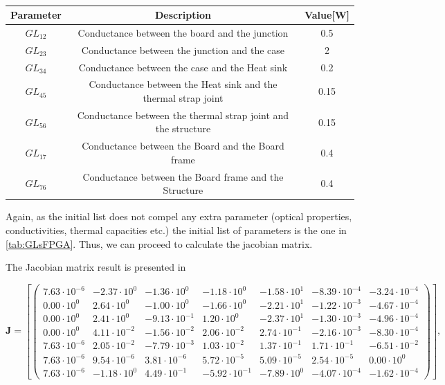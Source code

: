 \begin{table}[H]
\centering
\caption{}
\label{tab:GLsFPGA}

\begin{tabular}{c c c}
\toprule
\multicolumn{1}{c}{\textbf{Parameter}} & \multicolumn{1}{c}{\textbf{Description}} & \multicolumn{1}{c}{\textbf{Value}[W]} \\ \midrule
$GL_{12}$  & Conductance between the board and the junction  & 0.5 \\ 
$GL_{23}$  & Conductance between the junction and the case  &  2\\ 
$GL_{34}$  & Conductance between the case and the Heat sink  & 0.2 \\ 
$GL_{45}$  & Conductance between the Heat sink and the thermal strap joint  & 0.15 \\ 
$GL_{56}$  & Conductance between the thermal strap joint and the structure  & 0.15 \\ 
$GL_{17}$  & Conductance between the Board and the Board frame  & 0.4 \\ 
$GL_{76}$  & Conductance between the Board frame and the Structure  & 0.4 \\ \bottomrule
\end{tabular}
\end{table}

Again, as the initial list does not compel any extra parameter (optical properties, conductivities, thermal capacities etc.) the initial list of parameters is the one in \autoref{tab:GLsFPGA}. Thus, we can proceed to calculate the jacobian matrix.

The Jacobian matrix result is presented in 

\begin{equation}
\boldsymbol{J} =\left[\begin{pmatrix}
    7.63 \cdot 10^{-6} & -2.37 \cdot 10^{0} & -1.36 \cdot 10^{0} & -1.18 \cdot 10^{0} & -1.58 \cdot 10^{1} & -8.39 \cdot 10^{-4} & -3.24 \cdot 10^{-4} \\
    0.00 \cdot 10^{0} & 2.64 \cdot 10^{0} & -1.00 \cdot 10^{0} & -1.66 \cdot 10^{0} & -2.21 \cdot 10^{1} & -1.22 \cdot 10^{-3} & -4.67 \cdot 10^{-4} \\
    0.00 \cdot 10^{0} & 2.41 \cdot 10^{0} & -9.13 \cdot 10^{-1} & 1.20 \cdot 10^{0} & -2.37 \cdot 10^{1} & -1.30 \cdot 10^{-3} & -4.96 \cdot 10^{-4} \\
    0.00 \cdot 10^{0} & 4.11 \cdot 10^{-2} & -1.56 \cdot 10^{-2} & 2.06 \cdot 10^{-2} & 2.74 \cdot 10^{-1} & -2.16 \cdot 10^{-3} & -8.30 \cdot 10^{-4} \\
    7.63 \cdot 10^{-6} & 2.05 \cdot 10^{-2} & -7.79 \cdot 10^{-3} & 1.03 \cdot 10^{-2} & 1.37 \cdot 10^{-1} & 1.71 \cdot 10^{-1} & -6.51 \cdot 10^{-2} \\
    7.63 \cdot 10^{-6} & 9.54 \cdot 10^{-6} & 3.81 \cdot 10^{-6} & 5.72 \cdot 10^{-5} & 5.09 \cdot 10^{-5} & 2.54 \cdot 10^{-5} & 0.00 \cdot 10^{0} \\
    7.63 \cdot 10^{-6} & -1.18 \cdot 10^{0} & 4.49 \cdot 10^{-1} & -5.92 \cdot 10^{-1} & -7.89 \cdot 10^{0} & -4.07 \cdot 10^{-4} & -1.62 \cdot 10^{-4}
  \end{pmatrix}\right],
\label{eq:jacobianFPGA}
\end{equation}

